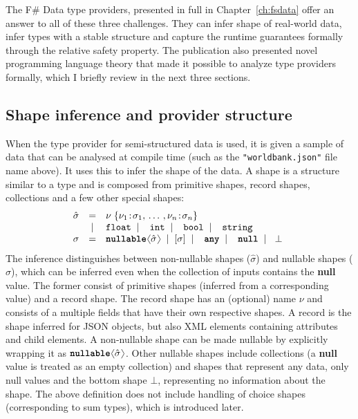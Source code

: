 \documentclass[fleqn,11pt]{report}
\newcommand{\lsep}[0]{\;\; | \;\;}
\newcommand{\kvd}[1]{\textnormal{\ttfamily\bfseries #1}}
\newcommand{\ident}[1]{\textnormal{\ttfamily #1}}
\newcommand{\langl}{\begin{picture}(4.5,7)
\put(1.1,2.5){\rotatebox{60}{\line(1,0){5.5}}}
\put(1.1,2.5){\rotatebox{300}{\line(1,0){5.5}}}
\end{picture}}
\newcommand{\rangl}{\begin{picture}(4.5,7)
\put(.9,2.5){\rotatebox{120}{\line(1,0){5.5}}}
\put(.9,2.5){\rotatebox{240}{\line(1,0){5.5}}}
\end{picture}}
\theoremstyle{definition}
\begin{document}
The F\# Data type providers, presented in full in Chapter~\ref{ch:fsdata} offer an answer to
all of these three challenges. They can infer shape of real-world data, infer types with a stable
structure and capture the runtime guarantees formally through the relative safety property. The
publication also presented novel programming language theory that made it possible to analyze type
providers formally, which I briefly review in the next three sections.

\subsection{Shape inference and provider structure}
When the type provider for semi-structured data is used, it is given a sample of data that
can be analysed at compile time (such as the \texttt{"worldbank.json"} file name above). It
uses this to infer the shape of the data. A shape is a structure similar to a type and is
composed from primitive shapes, record shapes, collections and a few other special shapes:
%
\begin{equation*}
\begin{array}{rcl}
 \hat{\sigma} &=& \nu \; \{ \nu_1 \!:\! \sigma_1, \,\ldots\,, \nu_n \!:\! \sigma_n \}\\
                &|& \ident{float} \lsep \ident{int} \lsep \ident{bool} \lsep \ident{string}\\
       \sigma &=& \kvd{nullable}\langl \hat{\sigma} \rangl \lsep [\sigma] \lsep \kvd{any} \lsep \kvd{null}  \lsep ~\bot~
\end{array}
\end{equation*}
%
The inference distinguishes between non-nullable shapes ($\hat{\sigma}$) and nullable shapes
($\sigma$), which can be inferred even when the collection of inputs contains the \kvd{null}
value. The former consist of primitive shapes (inferred from a corresponding value) and
a record shape. The record shape has an (optional) name $\nu$ and consists of a multiple fields
that have their own respective shapes. A record is the shape inferred for JSON objects, but also
XML elements containing attributes and child elements. A non-nullable shape can be made nullable
by explicitly wrapping it as $\kvd{nullable}\langl \hat{\sigma} \rangl$. Other nullable shapes
include collections (a \kvd{null} value is treated as an empty collection) and shapes that represent
any data, only null values and the bottom shape $\bot$, representing no information about the shape.
The above definition does not include handling of choice shapes (corresponding to sum types), which
is introduced later.
\end{document}
